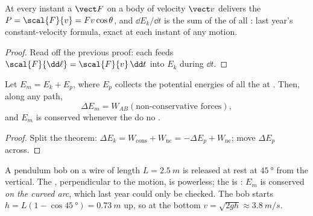\begin{proposition}\label{prop:g12:work-and-energy:power}
At every instant a  $\vect F$ on a body of velocity $\vect v$
delivers the  $P = \scal{F}{v} = Fv\cos\theta$, and
$\dd E_k/\dd t$ is the sum of the  of all : last year's
constant-velocity formula, exact at each instant of any motion.
\end{proposition}

\begin{proof}
Read off the previous proof: each  feeds
$\scal{F}{\dd\ell} = \scal{F}{v}\,\dd t$ into $E_k$ during $\dd t$.
\end{proof}

\begin{theorem}\label{thm:g12:work-and-energy:emtheorem}
Let $E_m = E_k + E_p$, where $E_p$ collects the potential energies of
all the  at . Then, along any path,
\[
\Delta E_m = W_{AB}(\text{non-conservative forces}),
\]
and $E_m$ is conserved whenever the  do no .
\end{theorem}

\begin{proof}
Split the  theorem: $\Delta E_k = W_{\text{cons}} +
W_{\text{nc}} = -\Delta E_p + W_{\text{nc}}$; move $\Delta E_p$ across.
\end{proof}

\begin{example}\label{ex:g12:work-and-energy:pendulum}
A pendulum bob on a wire of length $L = \qty{2.5}{m}$ is released at
rest at $\qty{45}{\degree}$ from the vertical. The ,
perpendicular to the motion, is powerless; the  is :
$E_m$ is conserved \emph{on the curved arc}, which last year could
only be checked. The bob starts $h = L(1 - \cos\qty{45}{\degree}) =
\qty{0.73}{m}$ up, so at the bottom $v = \sqrt{2gh} \approx
\qty{3.8}{m/s}$.
\end{example}

